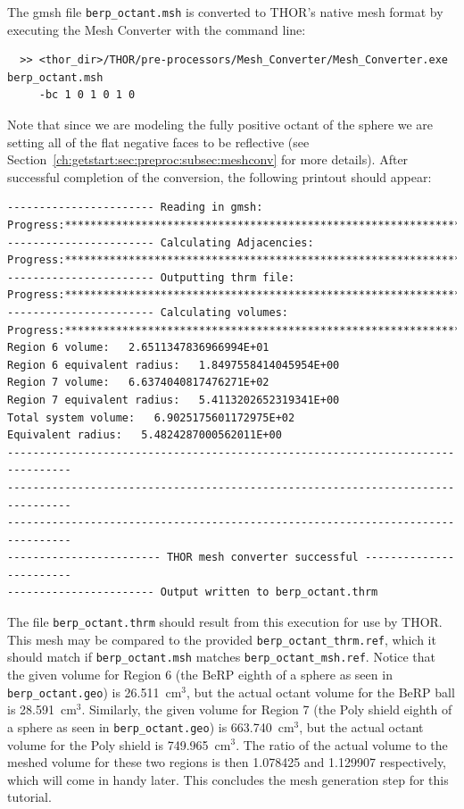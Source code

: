 The gmsh file \verb"berp_octant.msh" is converted to \ac{THOR}'s native mesh format by executing the Mesh Converter with the command line:
\begin{verbatim}
  >> <thor_dir>/THOR/pre-processors/Mesh_Converter/Mesh_Converter.exe berp_octant.msh
     -bc 1 0 1 0 1 0
\end{verbatim}
Note that since we are modeling the fully positive octant of the sphere we are setting all of the flat negative faces to be reflective (see Section~\ref{ch:getstart:sec:preproc:subsec:meshconv} for more details).
After successful completion of the conversion, the following printout should appear:
\begin{verbatim}
----------------------- Reading in gmsh:
Progress:***********************************************************************
----------------------- Calculating Adjacencies:
Progress:***********************************************************************
----------------------- Outputting thrm file:
Progress:***********************************************************************
----------------------- Calculating volumes:
Progress:***********************************************************************
Region 6 volume:   2.6511347836966994E+01
Region 6 equivalent radius:   1.8497558414045954E+00
Region 7 volume:   6.6374040817476271E+02
Region 7 equivalent radius:   5.4113202652319341E+00
Total system volume:   6.9025175601172975E+02
Equivalent radius:   5.4824287000562011E+00
--------------------------------------------------------------------------------
--------------------------------------------------------------------------------
--------------------------------------------------------------------------------
------------------------ THOR mesh converter successful ------------------------
----------------------- Output written to berp_octant.thrm
\end{verbatim}

The file \verb"berp_octant.thrm" should result from this execution for use by \ac{THOR}.
This mesh may be compared to the provided \verb"berp_octant_thrm.ref", which it should match if \verb"berp_octant.msh" matches \verb"berp_octant_msh.ref".
Notice that the given volume for Region 6 (the BeRP eighth of a sphere as seen in \verb"berp_octant.geo") is 26.511~cm$^3$, but the actual octant volume for the BeRP ball is 28.591~cm$^3$.
Similarly, the given volume for Region 7 (the Poly shield eighth of a sphere as seen in \verb"berp_octant.geo") is 663.740~cm$^3$, but the actual octant volume for the Poly shield is 749.965~cm$^3$.
The ratio of the actual volume to the meshed volume for these two regions is then 1.078425 and 1.129907 respectively, which will come in handy later.
This concludes the mesh generation step for this tutorial.

